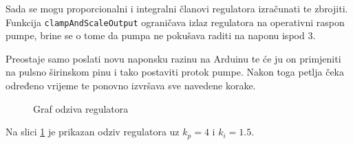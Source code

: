 Sada se mogu proporcionalni i integralni članovi regulatora izračunati te
zbrojiti. Funkcija \texttt{clampAndScaleOutput} ograničava izlaz
regulatora na operativni raspon pumpe, brine se o tome da pumpa ne pokušava
raditi na naponu ispod \unit{3}{\volt}.

Preostaje samo poslati novu naponsku razinu na Arduinu te će ju on primjeniti na
pulsno širinskom pinu i tako postaviti protok pumpe. Nakon toga petlja čeka
određeno vrijeme te ponovno izvršava sve navedene korake.

\begin{figure}[H]
\centering
{}
\caption{Graf odziva regulatora}
\label{fig:step_response}
\end{figure}

Na slici \ref{fig:step_response} je prikazan odziv regulatora uz $k_p = 4$ i
$k_i = 1.5$.
